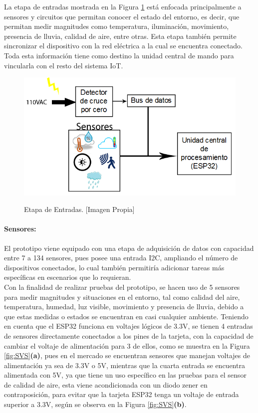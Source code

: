 	La etapa de entradas mostrada en la Figura \ref{fig:BEntradas} está enfocada principalmente a sensores y circuitos que permitan conocer el estado del entorno, es decir, que permitan medir magnitudes como temperatura, iluminación, movimiento, presencia de lluvia, calidad de aire, entre otras. Esta etapa también permite sincronizar el dispositivo con la red eléctrica a la cual se encuentra conectado. Toda esta información tiene como destino la unidad central de mando para vincularla con el resto del sistema IoT.
	
	\begin{figure}[H]
		\centering
		\caption[Etapa de Entradas.]{Etapa de Entradas. [Imagen Propia]}
		\includegraphics[width=0.9\linewidth]{Imagenes/B_Entradas}\label{fig:BEntradas}
	\end{figure}
	
	\paragraph{Sensores:}
		El prototipo viene equipado con una etapa de adquisición de datos con capacidad entre 7 a 134 sensores, pues posee una entrada I2C, ampliando el número de dispositivos conectados, lo cual también permitiría adicionar tareas más específicas en escenarios que lo requieran.\\
		
		Con la finalidad de realizar pruebas del prototipo, se hacen uso de 5 sensores para medir magnitudes y situaciones en el entorno, tal como calidad del aire, temperatura, humedad, luz visible, movimiento y presencia de lluvia, debido a que estas medidas o estados se encuentran en casi cualquier ambiente. Teniendo en cuenta que el ESP32 funciona en voltajes lógicos de 3.3V, se tienen 4 entradas de sensores directamente conectados a los pines de la tarjeta, con la capacidad de cambiar el voltaje de alimentación para 3 de ellos, como se muestra en la Figura \ref{fig:SVS}\textbf{(a)}, pues en el mercado se encuentran sensores que manejan voltajes de alimentación ya sea de 3.3V o 5V, mientras que la cuarta entrada se encuentra alimentada con 5V, ya que tiene un uso específico en las pruebas para el sensor de calidad de aire, esta viene acondicionada con un diodo zener en contraposición, para evitar que la tarjeta ESP32 tenga un voltaje de entrada superior a 3.3V, según se observa en la Figura \ref{fig:SVS}\textbf{(b)}.\\

